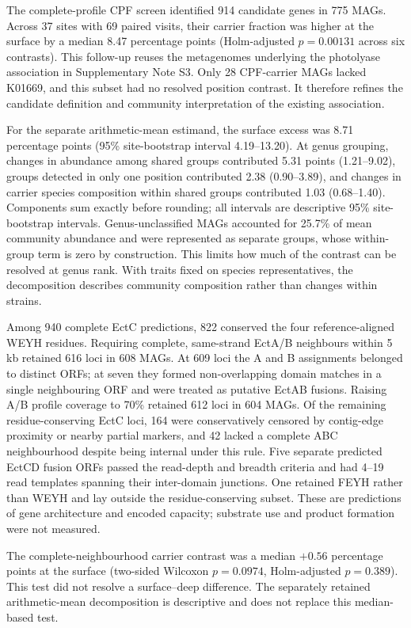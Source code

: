 \documentclass[11pt]{article}
\begin{document}
The complete-profile CPF screen identified 914 candidate genes in 775 MAGs. Across 37 sites with 69 paired visits, their carrier fraction was higher at the surface by a median 8.47 percentage points (Holm-adjusted $p=0.00131$ across six contrasts). This follow-up reuses the metagenomes underlying the photolyase association in Supplementary Note S3. Only 28 CPF-carrier MAGs lacked K01669, and this subset had no resolved position contrast. It therefore refines the candidate definition and community interpretation of the existing association.

For the separate arithmetic-mean estimand, the surface excess was 8.71 percentage points (95\% site-bootstrap interval 4.19--13.20). At genus grouping, changes in abundance among shared groups contributed 5.31 points (1.21--9.02), groups detected in only one position contributed 2.38 (0.90--3.89), and changes in carrier species composition within shared groups contributed 1.03 (0.68--1.40). Components sum exactly before rounding; all intervals are descriptive 95\% site-bootstrap intervals. Genus-unclassified MAGs accounted for 25.7\% of mean community abundance and were represented as separate groups, whose within-group term is zero by construction. This limits how much of the contrast can be resolved at genus rank. With traits fixed on species representatives, the decomposition describes community composition rather than changes within strains.

Among 940 complete EctC predictions, 822 conserved the four reference-aligned WEYH residues. Requiring complete, same-strand EctA/B neighbours within 5 kb retained 616 loci in 608 MAGs. At 609 loci the A and B assignments belonged to distinct ORFs; at seven they formed non-overlapping domain matches in a single neighbouring ORF and were treated as putative EctAB fusions. Raising A/B profile coverage to 70\% retained 612 loci in 604 MAGs. Of the remaining residue-conserving EctC loci, 164 were conservatively censored by contig-edge proximity or nearby partial markers, and 42 lacked a complete ABC neighbourhood despite being internal under this rule. Five separate predicted EctCD fusion ORFs passed the read-depth and breadth criteria and had 4--19 read templates spanning their inter-domain junctions. One retained FEYH rather than WEYH and lay outside the residue-conserving subset. These are predictions of gene architecture and encoded capacity; substrate use and product formation were not measured.

The complete-neighbourhood carrier contrast was a median $+0.56$ percentage points at the surface (two-sided Wilcoxon $p=0.0974$, Holm-adjusted $p=0.389$). This test did not resolve a surface--deep difference. The separately retained arithmetic-mean decomposition is descriptive and does not replace this median-based test.
\end{document}
